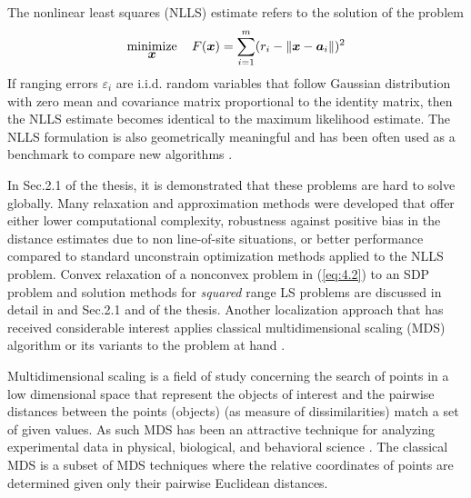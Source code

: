 The nonlinear least squares (NLLS) estimate refers to the solution of the problem
\begin{equation}\label{eq:4.2} %
\Min_{\Bx} \quad F(\Bx)=\sum_{i=1}^{m} (r_i - \|{\Bx} - {\Ba}_i\|)^2
\end{equation}
If ranging errors $\varepsilon_i$ are i.i.d. random variables that follow Gaussian distribution with zero mean and covariance matrix proportional to the identity matrix, then the NLLS estimate becomes identical to the maximum likelihood estimate. The NLLS formulation is also geometrically meaningful and has been often used as a benchmark to compare new algorithms \cite{BeckStLi,UWB}. 



In Sec.2.1 of the thesis, it is demonstrated that these problems are hard to solve globally. Many relaxation and approximation methods were developed that offer either lower computational complexity, robustness against positive bias in the distance estimates due to non line-of-site situations, or better performance compared to standard unconstrain optimization methods applied to the NLLS problem. Convex relaxation of a nonconvex problem in (\ref{eq:4.2}) to an SDP problem and solution methods for \textit{squared} range LS problems are discussed in detail in \cite{IRWSg} and  Sec.2.1 and of the thesis. Another localization approach that has received considerable interest applies classical multidimensional scaling (MDS) algorithm or its variants to the problem at hand \cite{classMDS, fastMDS, dwMDS, genMDS}. 

Multidimensional scaling is a field of study concerning the search of points in a
low dimensional space that represent the objects of interest and the pairwise distances between the points (objects) (as measure of dissimilarities) match a set of given values. As such MDS has been an attractive technique for analyzing experimental data in physical, biological, and behavioral science  \cite{classMDS}. The classical MDS is a subset of MDS techniques where the relative coordinates of points  are determined given only their pairwise Euclidean distances.
%
%

